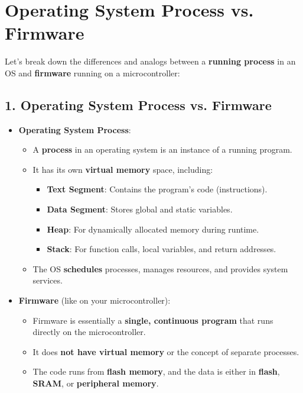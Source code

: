 \documentclass{article}
\begin{document}
\section*{Operating System Process vs. Firmware}

Let's break down the differences and analogs between a \textbf{running process} in an OS and \textbf{firmware} running on a microcontroller:

\subsection*{1. Operating System Process vs. Firmware}
\begin{itemize}
    \item \textbf{Operating System Process}:
    \begin{itemize}
        \item A \textbf{process} in an operating system is an instance of a running program.
        \item It has its own \textbf{virtual memory} space, including:
        \begin{itemize}
            \item \textbf{Text Segment}: Contains the program’s code (instructions).
            \item \textbf{Data Segment}: Stores global and static variables.
            \item \textbf{Heap}: For dynamically allocated memory during runtime.
            \item \textbf{Stack}: For function calls, local variables, and return addresses.
        \end{itemize}
        \item The OS \textbf{schedules} processes, manages resources, and provides system services.
    \end{itemize}
    \item \textbf{Firmware} (like on your microcontroller):
    \begin{itemize}
        \item Firmware is essentially a \textbf{single, continuous program} that runs directly on the microcontroller.
        \item It does \textbf{not have virtual memory} or the concept of separate processes.
        \item The code runs from \textbf{flash memory}, and the data is either in \textbf{flash}, \textbf{SRAM}, or \textbf{peripheral memory}.
    \end{itemize}
\end{itemize}
\end{document}

